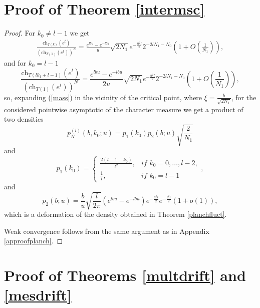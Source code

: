 \documentclass[11pt]{amsart}
\begin{document}
\section{Proof of Theorem \ref{intermsc}}\label{proofintermsc}
\begin{proof}
	For $k_0\neq l-1$ we get
	\begin{eqnarray*}
		\frac{\mathrm{ch}_{T(k)}(e^t)}{(\mathrm{ch}_{T(1)}(e^t))^N}=\frac{e^{lbu}-e^{-lbu}}{u}\sqrt{2N_1}e^{-\frac{u^2l}{2}}2^{-2lN_1-N_0}\left(1+O\left(\frac{1}{N_1}\right)\right),
	\end{eqnarray*}
	and for $k_0=l-1$
	\begin{equation*}
	\frac{\mathrm{ch}_{T(lk_1+l-1)}(e^t)}{(\mathrm{ch}_{T(1)}(e^t))^N}=\frac{e^{lbu}-e^{-lbu}}{2u}\sqrt{2N_1}e^{-\frac{u^2l}{2}}2^{-2lN_1-N_0}\left(1+O\left(\frac{1}{N_1}\right)\right),
	\end{equation*}
	so, expanding (\ref{mass}) in the vicinity of the critical point, where $\xi=\frac{b}{\sqrt{2N_1}}$, for the considered pointwise asymptotic of the character measure we get a product of two densities
	\begin{equation*}
	p^{(l)}_N(b,k_0;u)=p_1(k_0)p_2(b;u)\sqrt{\frac{2}{N_1}}
	\end{equation*}
	and
	\begin{equation*}
	p_1(k_0)=\begin{cases}
	\frac{2(l-1-k_0)}{l^2},& \textit{if $k_0=0,\ldots,l-2$},\\
	\frac{1}{l},& \textit{if $k_0=l-1$}
	\end{cases},
	\end{equation*}
	and
	\begin{equation*}
	p_2(b;u)=\frac{b}{u}\sqrt{\frac{l}{2\pi}}(e^{lbu}-e^{-lbu})e^{-\frac{u^2l}{2}} e^{-\frac{b^2l}{2}}(1+o(1)),
	\end{equation*}
	which is a deformation of the density obtained in Theorem \ref{planchfluct}. 
 

    Weak convergence follows from the same argument as in Appendix \ref{approofplanch}.
\end{proof}



\section{Proof of Theorems \ref{multdrift} and \ref{mesdrift}}\label{proofdrift}
\end{document}
